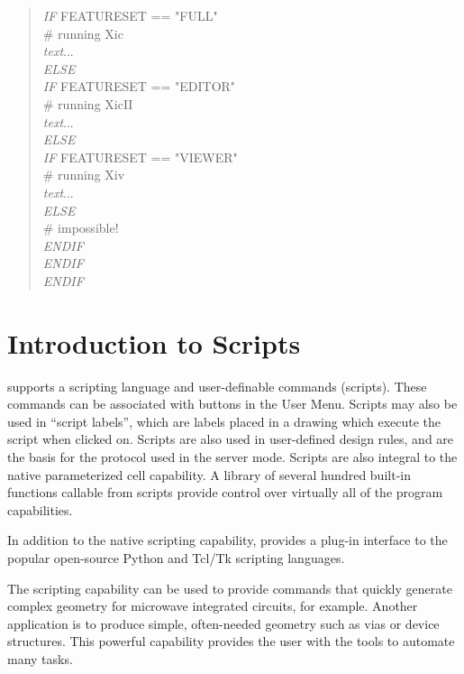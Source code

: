 \begin{quote}
{\it IF} {\vt FEATURESET == "FULL"}\\
\# running Xic\\
{\it text\/}...\\
{\it ELSE}\\
{\it IF} {\vt FEATURESET == "EDITOR"}\\
\# running XicII\\
{\it text\/}...\\
{\it ELSE}\\
{\it IF} {\vt FEATURESET == "VIEWER"}\\
\# running Xiv\\
{\it text\/}...\\
{\it ELSE}\\
\# impossible!\\
{\it ENDIF}\\
{\it ENDIF}\\
{\it ENDIF}\\
\end{quote}


\section{Introduction to {\Xic} Scripts}
\label{scriptintro}

{\Xic} supports a scripting language and user-definable commands
(scripts).  These commands can be associated with buttons in the {\cb
User Menu}.  Scripts may also be used in ``script labels'', which are
labels placed in a drawing which execute the script when clicked on. 
Scripts are also used in user-defined design rules, and are the basis
for the protocol used in the {\Xic} server mode.  Scripts are also
integral to the native parameterized cell capability.  A library of
several hundred built-in functions callable from scripts provide
control over virtually all of the program capabilities.

In addition to the native scripting capability, {\Xic} provides a
plug-in interface to the popular open-source Python and Tcl/Tk
scripting languages. 

The scripting capability can be used to provide commands that quickly
generate complex geometry for microwave integrated circuits, for
example.  Another application is to produce simple, often-needed
geometry such as vias or device structures.  This powerful capability
provides the user with the tools to automate many tasks.


